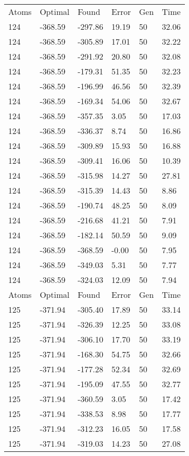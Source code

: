 \documentclass{report}
\begin{document}
\begin{appendix}
\begin{longtable}{llllll}
Atoms & Optimal & Found & Error & Gen & Time \\
124 & -368.59 & -297.86 & 19.19 & 50 & 32.06 \\
124 & -368.59 & -305.89 & 17.01 & 50 & 32.22 \\
124 & -368.59 & -291.92 & 20.80 & 50 & 32.08 \\
124 & -368.59 & -179.31 & 51.35 & 50 & 32.23 \\
124 & -368.59 & -196.99 & 46.56 & 50 & 32.39 \\
124 & -368.59 & -169.34 & 54.06 & 50 & 32.67 \\
124 & -368.59 & -357.35 & 3.05 & 50 & 17.03 \\
124 & -368.59 & -336.37 & 8.74 & 50 & 16.86 \\
124 & -368.59 & -309.89 & 15.93 & 50 & 16.88 \\
124 & -368.59 & -309.41 & 16.06 & 50 & 10.39 \\
124 & -368.59 & -315.98 & 14.27 & 50 & 27.81 \\
124 & -368.59 & -315.39 & 14.43 & 50 & 8.86 \\
124 & -368.59 & -190.74 & 48.25 & 50 & 8.09 \\
124 & -368.59 & -216.68 & 41.21 & 50 & 7.91 \\
124 & -368.59 & -182.14 & 50.59 & 50 & 9.09 \\
124 & -368.59 & -368.59 & -0.00 & 50 & 7.95 \\
124 & -368.59 & -349.03 & 5.31 & 50 & 7.77 \\
124 & -368.59 & -324.03 & 12.09 & 50 & 7.94 \\
Atoms & Optimal & Found & Error & Gen & Time \\
125 & -371.94 & -305.40 & 17.89 & 50 & 33.14 \\
125 & -371.94 & -326.39 & 12.25 & 50 & 33.08 \\
125 & -371.94 & -306.10 & 17.70 & 50 & 33.19 \\
125 & -371.94 & -168.30 & 54.75 & 50 & 32.66 \\
125 & -371.94 & -177.28 & 52.34 & 50 & 32.69 \\
125 & -371.94 & -195.09 & 47.55 & 50 & 32.77 \\
125 & -371.94 & -360.59 & 3.05 & 50 & 17.42 \\
125 & -371.94 & -338.53 & 8.98 & 50 & 17.77 \\
125 & -371.94 & -312.23 & 16.05 & 50 & 17.58 \\
125 & -371.94 & -319.03 & 14.23 & 50 & 27.08 \\

\end{longtable}
\end{appendix}
\end{document}
